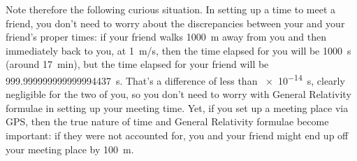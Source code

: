 \documentclass[a4paper,12pt,%
onecolumn,oneside,%
british%
]{memoir}
\renewcommand*{\|}[1][]{\nonscript\:#1\vert\nonscript\:\mathopen{}}
\newcommand*{\yc}{c} %
\begin{document}
Note therefore the following curious situation. In setting up a time to meet a friend, you don't need to worry about the discrepancies between your and your friend's proper times: if your friend walks \qty{1000}{m} away from you and then immediately back to you, at \qty{1}{m/s}, then the time elapsed for you will be \qty{1000}{s} (around \qty{17}{min}), but the time elapsed for your friend will be \qty{999.999999999999994437}{s}. That's a difference of less than \qty{e-14}{s}, clearly negligible for the two of you, so you don't need to worry with General Relativity formulae in setting up your meeting time. Yet, if you set up a meeting place via GPS, then the true nature of time and General Relativity formulae become important: if they were not accounted for, you and your friend might end up off your meeting place by \qty{100}{m}.
\end{document}
